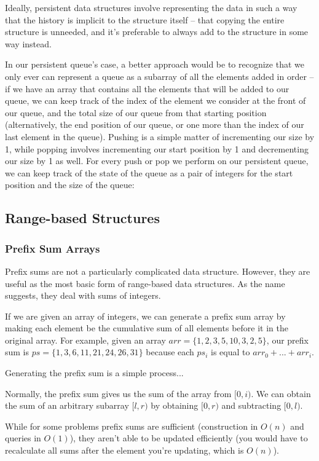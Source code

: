 Ideally, persistent data structures involve representing the data in such a way that the history is implicit to the structure itself -- that copying the entire structure is unneeded, and it's preferable to always add to the structure in some way instead.

In our persistent queue's case, a better approach would be to recognize that we only ever can represent a queue as a subarray of all the elements added in order -- if we have an array that contains all the elements that will be added to our queue, we can keep track of the index of the element we consider at the front of our queue, and the total size of our queue from that starting position (alternatively, the end position of our queue, or one more than the index of our last element in the queue). Pushing is a simple matter of incrementing our size by 1, while popping involves incrementing our start position by 1 and decrementing our size by 1 as well. For every push or pop we perform on our persistent queue, we can keep track of the state of the queue as a pair of integers for the start position and the size of the queue:

\subsection{Range-based Structures}
\subsubsection{Prefix Sum Arrays}

Prefix sums are not a particularly complicated data structure. However, they are useful as the most basic form of range-based data structures. As the name suggests, they deal with sums of integers.

If we are given an array of integers, we can generate a prefix sum array by making each element be the cumulative sum of all elements before it in the original array. For example, given an array $arr = \{1,2,3,5,10,3,2,5\}$, our prefix sum is $ps = \{1,3,6,11,21,24,26,31\}$ because each $ps_i$ is equal to $arr_0 + ... + arr_i$.

Generating the prefix sum is a simple process...

Normally, the prefix sum gives us the sum of the array from $[0,i)$. We can obtain the sum of an arbitrary subarray $[l,r)$ by obtaining $[0,r)$ and subtracting $[0,l)$. 

While for some problems prefix sums are sufficient (construction in $O(n)$ and queries in $O(1)$), they aren't able to be updated efficiently (you would have to recalculate all sums after the element you're updating, which is $O(n)$).

